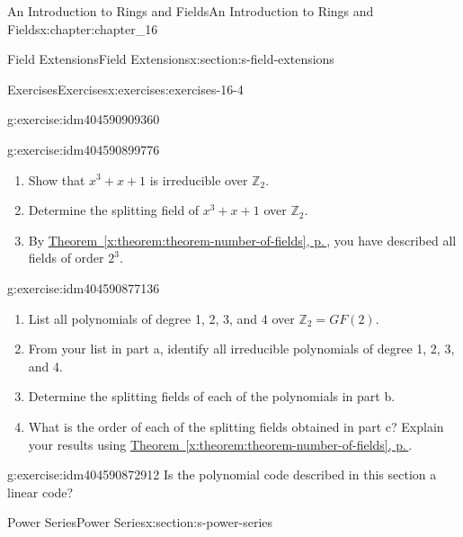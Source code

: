 \documentclass[twoside,10pt,]{book}
\newcommand{\xreffont}{\relax}
\numberwithin{equation}{section}
\begin{document}
\begin{chapterptx}{An Introduction to Rings and Fields}{}{An Introduction to Rings and Fields}{}{}{x:chapter:chapter_16}
\begin{sectionptx}{Field Extensions}{}{Field Extensions}{}{}{x:section:s-field-extensions}
\begin{exercises-subsection}{Exercises}{}{Exercises}{}{}{x:exercises:exercises-16-4}
\begin{divisionexercise}{4}{}{}{g:exercise:idm404590909360}
\begin{enumerate}[label=(\alph*)]
\end{enumerate}
%
\end{divisionexercise}%
\begin{divisionexercise}{5}{}{}{g:exercise:idm404590899776}%
%
\begin{enumerate}[label=(\alph*)]
\item{}Show that \(x^3+ x + 1\) is irreducible over \(\mathbb{Z}_2\).%
\item{}Determine the splitting field of \(x^3+ x + 1\) over \(\mathbb{Z}_2\).%
\item{}By \hyperref[x:theorem:theorem-number-of-fields]{Theorem~{\xreffont\ref{x:theorem:theorem-number-of-fields}}, p.\,\pageref{x:theorem:theorem-number-of-fields}}, you have described all fields of order \(2^3\).%
\end{enumerate}
%
\end{divisionexercise}%
\begin{divisionexercise}{6}{}{}{g:exercise:idm404590877136}%
%
\begin{enumerate}[label=(\alph*)]
\item{}List all polynomials of degree 1, 2, 3, and 4 over \(\mathbb{Z}_2 = GF(2)\).%
\item{}From your list in part a, identify all irreducible polynomials of degree 1, 2, 3, and 4.%
\item{}Determine the splitting fields of each of the polynomials in part b.%
\item{}What is the order of each of the splitting fields obtained in part c? Explain your results using \hyperref[x:theorem:theorem-number-of-fields]{Theorem~{\xreffont\ref{x:theorem:theorem-number-of-fields}}, p.\,\pageref{x:theorem:theorem-number-of-fields}}.%
\end{enumerate}
%
\end{divisionexercise}%
\begin{divisionexercise}{7}{}{}{g:exercise:idm404590872912}%
Is the polynomial code described in this section a linear code?%
\end{divisionexercise}%
\end{exercises-subsection}
\end{sectionptx}
%
%
\typeout{************************************************}
\typeout{************************************************}
%
\begin{sectionptx}{Power Series}{}{Power Series}{}{}{x:section:s-power-series}
%
%
\typeout{************************************************}

\end{sectionptx}
\end{chapterptx}
\end{document}
